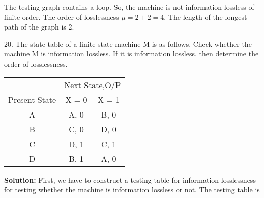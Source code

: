 \documentclass{article}
\begin{document}
\hspace*{0.1cm} The testing graph contains a loop. So, the machine is not information lossless of finite order. The order of losslessness $\mu = 2 + 2 = 4$. The length of the longest path of the graph is 2. 

$20.$ The state table of a finite state machine M is as follows. Check whether the machine M is information lossless. If it is information lossless, then determine the order of losslessness.\\

\begin{flushright}
  [WBUT 2003]
\end{flushright}
\vspace*{0.1cm}


\begin{center}
  \begin{tabular}{ccc}
\hline

\hline

\hline

\hline
 & \multicolumn{2}{c}{Next State,O/P}\\
 \cline{2-3}
Present State & X = 0 & X = 1\\
\hline
 A    &   A, 0   &   B, 0  \\
 B    &   C, 0   &   D, 0  \\
 C    &   D, 1   &   C, 1  \\
 D    &   B, 1   &   A, 0  \\
\hline

\hline

\hline

\hline

  \end{tabular}
\end{center}
\vspace*{0.1cm}


\large{\textbf{Solution:}} \small{First, we have to construct a testing table for information losslessness for testing whether the machine is information lossless or not. The testing table is}
\end{document}

